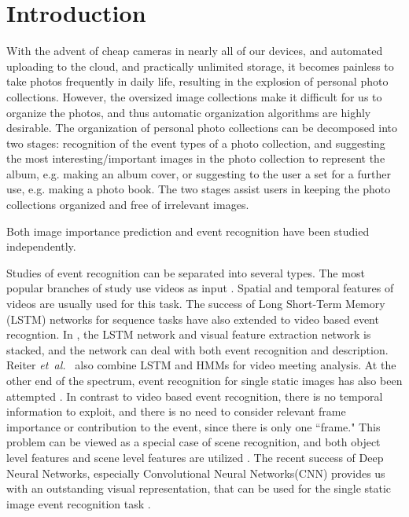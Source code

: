 \documentclass[runningheads]{llncs}
\newcommand{\etal}{\mbox{\emph{et al.\ }}}
\begin{document}
\section{Introduction}
With the advent of cheap cameras in nearly all of our devices, and automated uploading to the cloud, and practically unlimited storage,
it becomes painless to take photos frequently in daily life, resulting in the explosion of personal photo collections. However, the oversized image collections make it difficult for us to organize the photos, and thus automatic organization algorithms are highly desirable. The organization of personal photo collections can be decomposed into two stages: recognition of the event types of a photo collection, and suggesting the most interesting/important images in the photo collection to represent the album, e.g. making an album cover, or suggesting to the user a set for a further use, e.g. making a photo book. The two stages assist users in keeping the photo collections organized and free of irrelevant images.

Both image importance prediction and event recognition have been studied independently. 

Studies of event recognition can be separated into several types. The most popular branches of study use videos as input \cite{2015trecvidover, TangCVPR12, xu2015discriminative}. Spatial and temporal features of videos are usually used for this task. The success of Long Short-Term Memory (LSTM) networks for sequence tasks have also extended to video based event recogntion. In \cite{lstm}, the LSTM network and visual feature extraction network is stacked, and the network can deal with both event recognition and description. Reiter \etal \cite{lstm2} also combine LSTM and HMMs for video meeting analysis.
At the other end of the spectrum, event recognition for single static images has also been attempted \cite{what_where, Park_2015_CVPR_Workshops, cSalvadora}. In contrast to video based event recognition, there is no temporal information to exploit, and there is no need to consider relevant frame importance or contribution to the event, since there is only one ``frame." This problem can be viewed as a special case of scene recognition, and both object level features and scene level features are utilized \cite{what_where}. The recent success of Deep Neural Networks, especially  Convolutional Neural Networks(CNN) provides us with an outstanding visual representation, that can be used for the single static image event recognition task \cite{Park_2015_CVPR_Workshops, cSalvadora}. 
\end{document}

